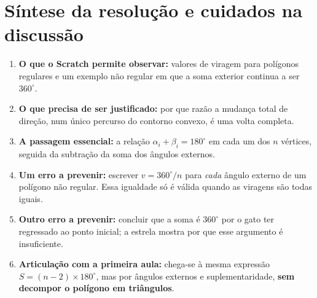 \section*{Síntese da resolução e cuidados na discussão}

\begin{enumerate}[label=\textbf{\arabic*.},leftmargin=1.05cm,itemsep=3pt,topsep=3pt]
\item \textbf{O que o Scratch permite observar:} valores de viragem
para polígonos regulares e um exemplo não regular em que a soma
exterior continua a ser $360^\circ$.
\item \textbf{O que precisa de ser justificado:} por que razão a
mudança total de direção, num único percurso do contorno convexo,
é uma volta completa.
\item \textbf{A passagem essencial:} a relação
$\alpha_i+\beta_i=180^\circ$ em cada um dos $n$ vértices, seguida
da subtração da soma dos ângulos externos.
\item \textbf{Um erro a prevenir:} escrever $v=360^\circ/n$
para \emph{cada} ângulo externo de um polígono não regular. Essa
igualdade só é válida quando as viragens são todas iguais.
\item \textbf{Outro erro a prevenir:} concluir que a soma é $360^\circ$
por o gato ter regressado ao ponto inicial; a estrela mostra por
que esse argumento é insuficiente.
\item \textbf{Articulação com a primeira aula:} chega-se à mesma
expressão $S=(n-2)\times180^\circ$, mas por ângulos externos e
suplementaridade, \textbf{sem decompor o polígono em triângulos}.
\end{enumerate}
